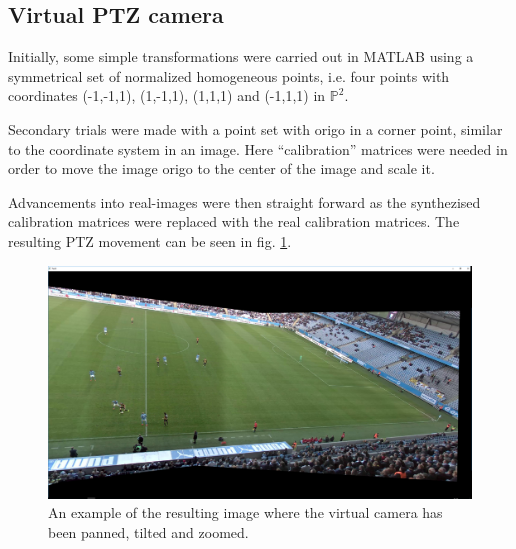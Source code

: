 \subsection{Virtual PTZ camera}
Initially, some simple transformations were carried out in MATLAB using a symmetrical set of normalized homogeneous points, i.e. four points with coordinates (-1,-1,1), (1,-1,1), (1,1,1) and (-1,1,1) in $\mathbb{P}^2$.

Secondary trials were made with a point set with origo in a corner point, similar to the coordinate system in an image.
Here ``calibration'' matrices were needed in order to move the image origo to the center of the image and scale it.

Advancements into real-images were then straight forward as the synthezised calibration matrices were replaced with the real calibration matrices.
The resulting PTZ movement can be seen in fig. \ref{fig:ptz_res}.

\begin{figure}[H]
	\centering
	\includegraphics[width=0.8\columnwidth]{../results/images/PTZ_res.PNG}
	\caption{An example of the resulting image where the virtual camera has been panned, tilted and zoomed.}
	\label{fig:ptz_res}
\end{figure}
